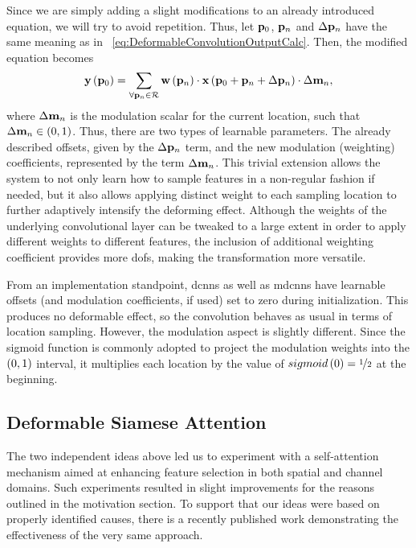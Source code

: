 Since we are simply adding a slight modifications to an already introduced equation, we will try to avoid repetition. Thus, let $\mathbf{p}_0$, $\mathbf{p}_n$ and $\Delta \mathbf{p}_n$ have the same meaning as in \eqtext{}~\ref{eq:DeformableConvolutionOutputCalc}. Then, the modified equation becomes
\begin{equation}
  \label{eq:ModulatedDeformableConvolutionOutputCalc}
  {\mathbf{y}} \left( \mathbf{p}_0 \right) =
  \sum_{\forall \mathbf{p}_n \in \mathcal{R}}
  {\mathbf{w}} \left( \mathbf{p}_n \right) \cdot {\mathbf{x}} \left( \mathbf{p}_0 + \mathbf{p}_n + \Delta \mathbf{p}_n \right) \cdot \Delta \mathbf{m}_n,
\end{equation}
where $\Delta \mathbf{m}_n$ is the modulation scalar for the current location, such that $\Delta \mathbf{m}_n \in \left( {0, 1} \right)$. Thus, there are two types of learnable parameters. The already described offsets, given by the $\Delta \mathbf{p}_n$ term, and the new modulation (weighting) coefficients, represented by the term $\Delta \mathbf{m}_n$. This trivial extension allows the system to not only learn how to sample features in a non-regular fashion if needed, but it also allows applying distinct weight to each sampling location to further adaptively intensify the deforming effect. Although the weights of the underlying convolutional layer can be tweaked to a large extent in order to apply different weights to different features, the inclusion of additional weighting coefficient provides more \glspl{dof}, making the transformation more versatile.

From an implementation standpoint, \glspl{dcnn} as well as \glspl{mdcnn} have learnable offsets (and modulation coefficients, if used) set to zero during initialization. This produces no deformable effect, so the convolution behaves as usual in terms of location sampling. However, the modulation aspect is slightly different. Since the sigmoid function is commonly adopted to project the modulation weights into the $\left( {0, 1} \right)$ interval, it multiplies each location by the value of ${sigmoid} \left( 0 \right) = \nicefrac{1}{2}$ at the beginning.

\subsection{Deformable Siamese Attention}
\label{ssec:DeformableSiameseAttention}

The two independent ideas above led us to experiment with a self-attention mechanism aimed at enhancing feature selection in both spatial and channel domains. Such experiments resulted in slight improvements for the reasons outlined in the motivation section. To support that our ideas were based on properly identified causes, there is a recently published work demonstrating the effectiveness of the very same approach.

